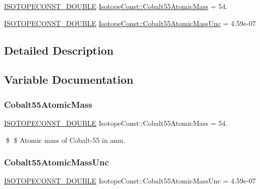 \begin{DoxyCompactItemize}
\item 
\mbox{\hyperlink{group___isotope_const-_macros_ga8f45a7272ce02c0b4c65c44636ed719a}{I\+S\+O\+T\+O\+P\+E\+C\+O\+N\+S\+T\+\_\+\+D\+O\+U\+B\+LE}} \mbox{\hyperlink{group___isotope_const-_cobalt-_co55_ga926397c15482544e31ff565ad37800a1}{Isotope\+Const\+::\+Cobalt55\+Atomic\+Mass}} = 54.
\item 
\mbox{\hyperlink{group___isotope_const-_macros_ga8f45a7272ce02c0b4c65c44636ed719a}{I\+S\+O\+T\+O\+P\+E\+C\+O\+N\+S\+T\+\_\+\+D\+O\+U\+B\+LE}} \mbox{\hyperlink{group___isotope_const-_cobalt-_co55_ga12a333c98115a2c074230828f736c617}{Isotope\+Const\+::\+Cobalt55\+Atomic\+Mass\+Unc}} = 4.\+59e-\/07
\end{DoxyCompactItemize}


\subsection{Detailed Description}


\subsection{Variable Documentation}
\mbox{\label{group___isotope_const-_cobalt-_co55_ga926397c15482544e31ff565ad37800a1}} 
\subsubsection{\texorpdfstring{Cobalt55\+Atomic\+Mass}{Cobalt55AtomicMass}}
{\footnotesize\ttfamily \mbox{\hyperlink{group___isotope_const-_macros_ga8f45a7272ce02c0b4c65c44636ed719a}{I\+S\+O\+T\+O\+P\+E\+C\+O\+N\+S\+T\+\_\+\+D\+O\+U\+B\+LE}} Isotope\+Const\+::\+Cobalt55\+Atomic\+Mass = 54.}

\$ \$ Atomic mass of Cobalt-\/55 in amu. \mbox{\label{group___isotope_const-_cobalt-_co55_ga12a333c98115a2c074230828f736c617}} 
\subsubsection{\texorpdfstring{Cobalt55\+Atomic\+Mass\+Unc}{Cobalt55AtomicMassUnc}}
{\footnotesize\ttfamily \mbox{\hyperlink{group___isotope_const-_macros_ga8f45a7272ce02c0b4c65c44636ed719a}{I\+S\+O\+T\+O\+P\+E\+C\+O\+N\+S\+T\+\_\+\+D\+O\+U\+B\+LE}} Isotope\+Const\+::\+Cobalt55\+Atomic\+Mass\+Unc = 4.\+59e-\/07}

